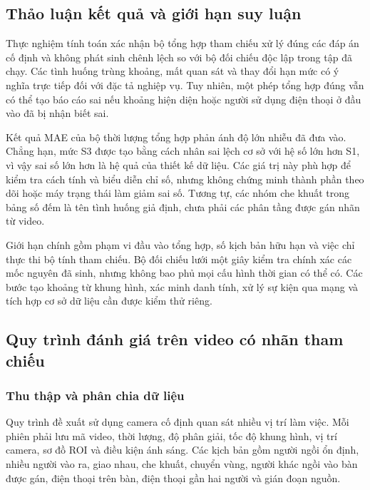 



\subsection{Thảo luận kết quả và giới hạn suy luận}
Thực nghiệm tính toán xác nhận bộ tổng hợp tham chiếu xử lý đúng các đáp án cố định và không phát sinh chênh lệch so với bộ đối chiếu độc lập trong tập đã chạy. Các tình huống trùng khoảng, mất quan sát và thay đổi hạn mức có ý nghĩa trực tiếp đối với đặc tả nghiệp vụ. Tuy nhiên, một phép tổng hợp đúng vẫn có thể tạo báo cáo sai nếu khoảng hiện diện hoặc người sử dụng điện thoại ở đầu vào đã bị nhận biết sai.

Kết quả MAE của bộ thời lượng tổng hợp phản ánh độ lớn nhiễu đã đưa vào. Chẳng hạn, mức S3 được tạo bằng cách nhân sai lệch cơ sở với hệ số lớn hơn S1, vì vậy sai số lớn hơn là hệ quả của thiết kế dữ liệu. Các giá trị này phù hợp để kiểm tra cách tính và biểu diễn chỉ số, nhưng không chứng minh thành phần theo dõi hoặc máy trạng thái làm giảm sai số. Tương tự, các nhóm che khuất trong bảng số đếm là tên tình huống giả định, chưa phải các phân tầng được gán nhãn từ video.

Giới hạn chính gồm phạm vi đầu vào tổng hợp, số kịch bản hữu hạn và việc chỉ thực thi bộ tính tham chiếu. Bộ đối chiếu lưới một giây kiểm tra chính xác các mốc nguyên đã sinh, nhưng không bao phủ mọi cấu hình thời gian có thể có. Các bước tạo khoảng từ khung hình, xác minh danh tính, xử lý sự kiện qua mạng và tích hợp cơ sở dữ liệu cần được kiểm thử riêng.

\subsection{Quy trình đánh giá trên video có nhãn tham chiếu}
\label{sec:video-evaluation-plan}
\subsubsection{Thu thập và phân chia dữ liệu}
Quy trình đề xuất sử dụng camera cố định quan sát nhiều vị trí làm việc. Mỗi phiên phải lưu mã video, thời lượng, độ phân giải, tốc độ khung hình, vị trí camera, sơ đồ ROI và điều kiện ánh sáng. Các kịch bản gồm người ngồi ổn định, nhiều người vào ra, giao nhau, che khuất, chuyển vùng, người khác ngồi vào bàn được gán, điện thoại trên bàn, điện thoại gần hai người và gián đoạn nguồn.

